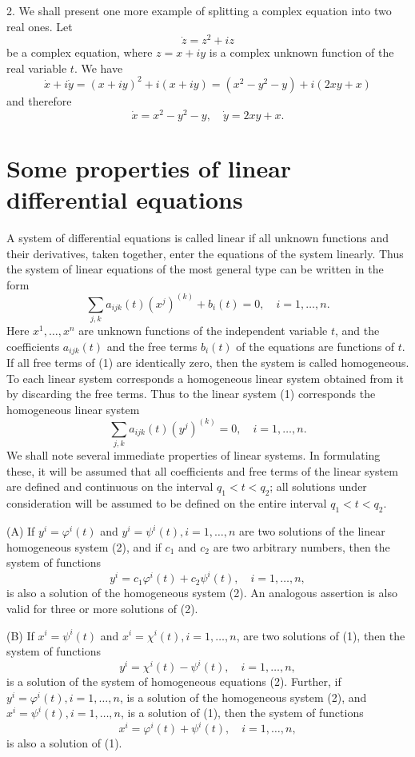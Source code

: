 \documentclass[10pt,a5paper]{book}
\theoremstyle{plain}
\theoremstyle{definition}
\theoremstyle{remark}
\begin{document}
2. We shall present one more example of splitting a complex equation into two real ones. Let
\[
\dot{z}=z^{2}+i z
\]
be a complex equation, where $z=x+i y$ is a complex unknown function of the real variable $t$. We have
\[
\dot{x}+i \dot{y}=(x+i y)^{2}+i(x+i y)=\left(x^{2}-y^{2}-y\right)+i(2 x y+x)
\]
and therefore
\[
\dot{x}=x^{2}-y^{2}-y, \quad \dot{y}=2 x y+x .
\]

\section{Some properties of linear differential equations}
A system of differential equations is called linear if all unknown functions and their derivatives, taken together, enter the equations of the system linearly. Thus the system of linear equations of the most general type can be written in the form
\begin{equation*}
\sum_{j, k} a_{i j k}(t)\left(x^{j}\right)^{(k)}+b_{i}(t)=0, \quad i=1, \ldots, n . \tag{1}
\end{equation*}
Here $x^{1}, \ldots, x^{n}$ are unknown functions of the independent variable $t$, and the coefficients $a_{i j k}(t)$ and the free terms $b_{i}(t)$ of the equations are functions of $t$. If all free terms of (1) are identically zero, then the system is called homogeneous. To each linear system corresponds a homogeneous linear system obtained from it by discarding the free terms. Thus to the linear system (1) corresponds the homogeneous linear system
\begin{equation*}
\sum_{j, k} a_{i j k}(t)\left(y^{j}\right)^{(k)}=0, \quad i=1, \ldots, n . \tag{2}
\end{equation*}
We shall note several immediate properties of linear systems. In formulating these, it will be assumed that all coefficients and free terms of the linear system are defined and continuous on the interval $q_{1}<t<q_{2}$; all solutions under consideration will be assumed to be defined on the entire interval $q_{1}<t<q_{2}$.

(A) If $y^{i}=\varphi^{i}(t)$ and $y^{i}=\psi^{i}(t), i=1, \ldots, n$ are two solutions of the linear homogeneous system (2), and if $c_{1}$ and $c_{2}$ are two arbitrary numbers, then the system of functions
\[
y^{i}=c_{1} \varphi^{i}(t)+c_{2} \psi^{i}(t), \quad i=1, \ldots, n,
\]
is also a solution of the homogeneous system (2). An analogous assertion is also valid for three or more solutions of (2).

(B) If $x^{i}=\psi^{i}(t)$ and $x^{i}=\chi^{i}(t), i=1, \ldots, n$, are two solutions of (1), then the system of functions
\[
y^{i}=\chi^{i}(t)-\psi^{i}(t), \quad i=1, \ldots, n,
\]
is a solution of the system of homogeneous equations (2). Further, if $y^{i}=\varphi^{i}(t), i=1, \ldots, n$, is a solution of the homogeneous system (2), and $x^{i}=\psi^{i}(t), i=1, \ldots, n$, is a solution of (1), then the system of functions
\[
x^{i}=\varphi^{i}(t)+\psi^{i}(t), \quad i=1, \ldots, n,
\]
is also a solution of (1).
\end{document}
